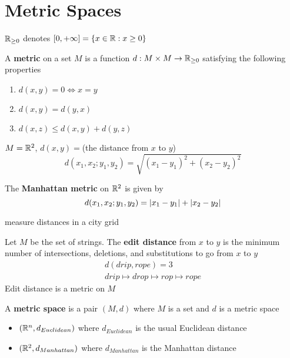 \documentclass[11pt]{article}
\begin{document}
\appendix
\section{Metric Spaces}
\label{sec:orgdad457c}
\(\mathbb{R}_{\ge 0}\) denotes \([0,+\infty]=\{x\in\mathbb{R}:x\ge 0\}\)
\begin{definition}[]
A \textbf{metric} on a set \(M\) is a function \(d:M\times M\to\mathbb{R}_{\ge 0}\) satisfying the following properties
\begin{enumerate}
\item \(d(x,y)=0\Leftrightarrow x=y\)
\item \(d(x,y)=d(y,x)\)
\item \(d(x,z)\le d(x,y)+d(y,z)\)
\end{enumerate}
\end{definition}

\begin{examplle}[]
\(M=\mathbb{R}^2\), \(d(x,y)=\)(the distance from \(x\) to \(y\))
\begin{equation*}
  d(x_1,x_2;y_1,y_2)=\sqrt{(x_1-y_1)^2+(x_2-y_2)^2}
\end{equation*}
\end{examplle}

\begin{examplle}[]
The \textbf{Manhattan metric} on \(\mathbb{R}^2\) is given by
\begin{equation*}
  d(x_1,x_2;y_1,y_2)=\abs{x_1-y_1}+\abs{x_2-y_2}
\end{equation*}

measure distances in a city grid
\end{examplle}

\begin{examplle}[]
Let \(M\) be the set of strings. The \textbf{edit distance} from \(x\) to \(y\) is the minimum number of
intersections, deletions, and substitutions to go from \(x\) to \(y\)
\begin{gather*}
  d(drip,rope)=3\\
  drip\mapsto drop\mapsto rop\mapsto rope
\end{gather*}
Edit distance is a metric on \(M\)
\end{examplle}

\begin{definition}[]
A \textbf{metric space} is a pair \((M,d)\) where \(M\) is a set and \(d\) is a metric space
\end{definition}

\begin{itemize}
\item \((\mathbb{R}^n,d_{Euclidean})\) where \(d_{Euclidean}\) is the usual Euclidean distance
\item \((\mathbb{R}^2,d_{Manhattan})\) where \(d_{Manhattan}\) is the Manhattan distance
\end{itemize}
\end{document}
